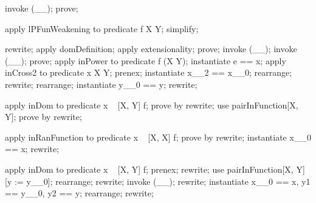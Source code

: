 \begin{LPScript}\begin{forget}[lPFunWeakening]
invoke (\_\pfun \_);
prove;
\end{forget}\end{LPScript}

\begin{LPScript}\begin{forget}[lPFunWeakeningFresh]
apply lPFunWeakening to predicate f \in  X \pfun  Y;
simplify;
\end{forget}\end{LPScript}

\begin{forget}[lEmptyDomIsEmptyPFun]
rewrite;
apply domDefinition;
apply extensionality;
prove;
invoke (\_\pfun \_);
invoke (\_\rel \_);
prove;
apply inPower to predicate f \in  \power  (X \cross  Y);
instantiate e == x;
apply inCross2 to predicate x \in  X \cross  Y;
prenex;
instantiate x\_\_2 == x\_\_0;
rearrange;
rewrite;
rearrange;
instantiate y\_\_0 == y;
rewrite;
\end{forget}


\begin{LPScript}\begin{forget}[lDomElemIsElemPFun]
apply inDom to predicate x \in  \dom~ [X, Y] f;
prove by rewrite;
use pairInFunction[X, Y];
prove by rewrite;
\end{forget}\end{LPScript}

\begin{LPScript}\begin{forget}[lHomogeneousMemberNoLoop]
apply inRanFunction to predicate x \in  \ran~ [X, X] f;
prove by rewrite;
instantiate x\_\_0 == x;
rewrite;
\end{forget}\end{LPScript}

\begin{LPScript}\begin{forget}[lNotImmediateMemberPFun]
apply inDom to predicate x \in  \dom~ [X, Y] f;
prenex;
rewrite;
use pairInFunction[X, Y][y := y\_\_0];
rearrange;
rewrite;
invoke (\_\pfun \_);
rewrite;
instantiate x\_\_0 == x, y1 == y\_\_0, y2 == y;
rearrange;
rewrite;
\end{forget}\end{LPScript}


